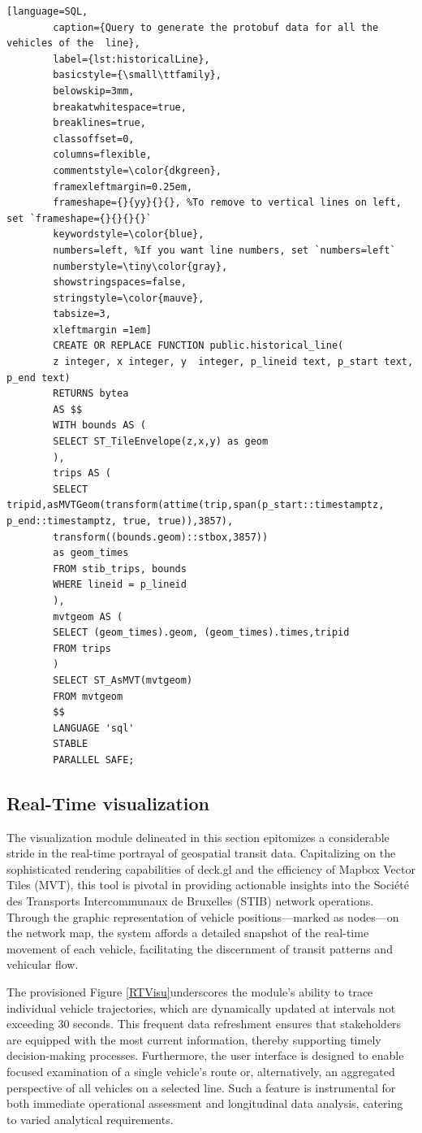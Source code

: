 \documentclass[12pt]{report}
\begin{document}
	\begin{lstlisting}[language=SQL,
		caption={Query to generate the protobuf data for all the vehicles of the  line},
		label={lst:historicalLine},
		basicstyle={\small\ttfamily},
		belowskip=3mm,
		breakatwhitespace=true,
		breaklines=true,
		classoffset=0,
		columns=flexible,
		commentstyle=\color{dkgreen},
		framexleftmargin=0.25em,
		frameshape={}{yy}{}{}, %To remove to vertical lines on left, set `frameshape={}{}{}{}`
		keywordstyle=\color{blue},
		numbers=left, %If you want line numbers, set `numbers=left`
		numberstyle=\tiny\color{gray},
		showstringspaces=false,
		stringstyle=\color{mauve},
		tabsize=3,
		xleftmargin =1em]
		CREATE OR REPLACE FUNCTION public.historical_line(
		z integer, x integer, y  integer, p_lineid text, p_start text, p_end text)
		RETURNS bytea
		AS $$
		WITH bounds AS (
		SELECT ST_TileEnvelope(z,x,y) as geom
		),
		trips AS (
		SELECT tripid,asMVTGeom(transform(attime(trip,span(p_start::timestamptz, p_end::timestamptz, true, true)),3857),
		transform((bounds.geom)::stbox,3857))
		as geom_times
		FROM stib_trips, bounds
		WHERE lineid = p_lineid
		),
		mvtgeom AS (
		SELECT (geom_times).geom, (geom_times).times,tripid
		FROM trips
		)
		SELECT ST_AsMVT(mvtgeom) 
		FROM mvtgeom
		$$
		LANGUAGE 'sql'
		STABLE
		PARALLEL SAFE;
	\end{lstlisting}
	
	
	
	
	
	\subsection{Real-Time visualization}
	The visualization module delineated in this section epitomizes a considerable stride in the real-time portrayal of geospatial transit data. Capitalizing on the sophisticated rendering capabilities of deck.gl and the efficiency of Mapbox Vector Tiles (MVT), this tool is pivotal in providing actionable insights into the Société des Transports Intercommunaux de Bruxelles (STIB) network operations. Through the graphic representation of vehicle positions—marked as nodes—on the network map, the system affords a detailed snapshot of the real-time movement of each vehicle, facilitating the discernment of transit patterns and vehicular flow.
	
	The provisioned Figure \ref{RTVisu}underscores the module's ability to trace individual vehicle trajectories, which are dynamically updated at intervals not exceeding 30 seconds. This frequent data refreshment ensures that stakeholders are equipped with the most current information, thereby supporting timely decision-making processes. Furthermore, the user interface is designed to enable focused examination of a single vehicle's route or, alternatively, an aggregated perspective of all vehicles on a selected line. Such a feature is instrumental for both immediate operational assessment and longitudinal data analysis, catering to varied analytical requirements.
	
\end{document}

